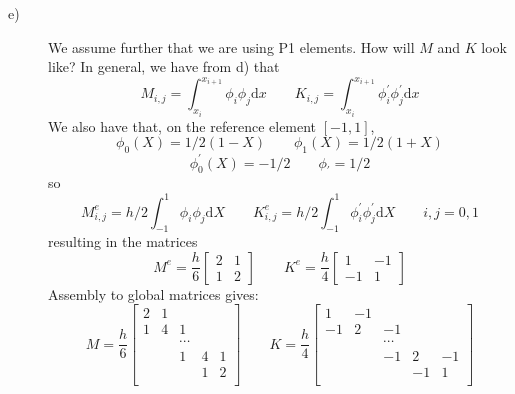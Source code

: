 \documentclass[a4paper,10pt]{article}
\begin{document}
\begin{description}
\newpage 
\item[e)]
We assume further that we are using P1 elements. How will $M$ and $K$ look like? In general, we have from d) that
\[ M_{i,j} = \int_{x_i}^{x_{i+1}} \phi_i \phi_j \mathrm{d} x \qquad K_{i,j} = \int_{x_i}^{x_{i+1}} \phi_i^{'} \phi_j^{'} \mathrm{d} x \]
We also have that, on the reference element $[-1,1]$,
\[ \phi_0(X) = 1/2 (1-X) \qquad \phi_1(X) = 1/2 (1+X) \]
\[ \phi_0^{'}(X) = -1/2 \qquad \phi_{'} = 1/2 \]
so
\[ M_{i,j}^e = h/2 \int_{-1}^1 \phi_i \phi_j \mathrm{d} X \qquad K_{i,j}^e = h/2 \int_{-1}^{1} \phi_i^{'} \phi_j^{'} \mathrm{d} X \qquad i,j = 0,1 \]
resulting in the matrices
\begin{equation*}
 M^e = \frac{h}{6}
 \begin{bmatrix}
  2 & 1\\
  1 & 2
 \end{bmatrix}
 \qquad
 K^e = \frac{h}{4}
 \begin{bmatrix}
  1 & -1\\
  -1 & 1
 \end{bmatrix}
\end{equation*}
Assembly to global matrices gives:
\begin{equation*}
 M = \frac{h}{6}
 \begin{bmatrix}
  2 & 1 \\
  1 & 4 & 1 \\
  & & \cdots \\
  & & 1 & 4 & 1 \\
  & & & 1 & 2 \\
 \end{bmatrix}
 \qquad
 K = \frac{h}{4}
 \begin{bmatrix}
  1 & -1 \\
  -1 & 2 & -1 \\
  & & \cdots \\
  & & -1 & 2 & -1 \\
  & & & -1 & 1 \\
 \end{bmatrix}
\end{equation*}




\end{description}
\end{document}
